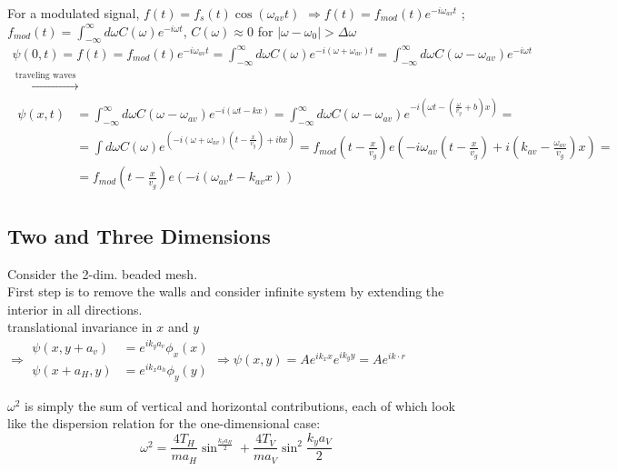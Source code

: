 \documentclass[twoside, 10pt]{amsart}
\begin{document}
For a modulated signal, $f(t) = f_s(t) \cos{(\omega_{av} t)}$ $\Longrightarrow f(t) = f_{mod}(t) e^{-i\omega_{av} t}$ ; \\
$f_{mod}(t) = \int_{-\infty}^{\infty} d\omega C(\omega) e^{-i\omega t}$, $C(\omega) \approx 0 $ for $|\omega - \omega_0| > \Delta \omega$
\[
\begin{gathered}
  \psi(0,t) = f(t) = f_{mod}(t) e^{-i\omega_{av} t } = \int_{-\infty}^{\infty} d\omega C(\omega) e^{-i (\omega + \omega_{av}) t } = \int_{-\infty}^{\infty} d\omega C(\omega - \omega_{av}) e^{-i \omega t} \\
  \xrightarrow{ \text{ traveling waves } } \\
  \begin{aligned} \psi(x,t) & = \int_{-\infty}^{\infty} d\omega C(\omega - \omega_{av}) e^{- i (\omega t - kx ) } = \int_{-\infty}^{\infty} d\omega C(\omega - \omega_{av}) e^{-i(\omega t - \left( \frac{\omega}{v_g} + b\right)x ) } = \\
    & = \int d\omega C(\omega) e^{\left( -i ( \omega + \omega_{av} )\left( t - \frac{x}{v_g} \right) + i bx \right)} = f_{mod}\left( t - \frac{x}{v_g} \right) e\left( -i \omega_{av} \left( t - \frac{x}{v_g} \right) + i \left( k_{av} - \frac{\omega_{av} }{ v_g} \right) x \right) = \\
    & = f_{mod}\left( t - \frac{x}{v_g} \right) e\left( -i (\omega_{av} t - k_{av} x ) \right)
\end{aligned}
\end{gathered}
\]

\subsection{Two and Three Dimensions}

Consider the 2-dim. beaded mesh.  \\
First step is to remove the walls and consider infinite system by extending the interior in all directions.  \\
translational invariance in $x$ and $y$ $\Longrightarrow \begin{aligned} \psi(x,y+a_v) & = e^{i k_y a_v } \phi_x(x) \\ \psi(x+a_H,y) & = e^{i k_x a_h} \phi_y(y) \end{aligned} \Longrightarrow \psi(x,y) = A e^{ik_x x } e^{i k_y y } = A e^{i k\cdot r }$

$\omega^2$ is simply the sum of vertical and horizontal contributions, each of which look like the dispersion relation for the one-dimensional case: 
\[
\omega^2 = \frac{ 4 T_H}{ ma_H} \sin^{ \frac{k_x a_H}{2} } + \frac{4 T_V}{ m a_V} \sin^2{\frac{ k_y a_V}{2} }
\]
\end{document}
